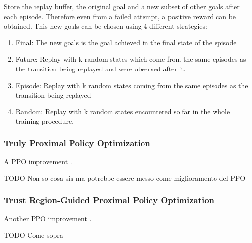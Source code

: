 \documentclass[12pt]{article}
\begin{document}
Store the replay buffer, the original goal and a new subset of other goals after each episode. Therefore even from a failed attempt, a positive reward can be obtained.
This new goals can be chosen using 4 different strategies:
\begin{enumerate}
    \item Final: The new goals is the goal achieved in the final state of the episode
    \item Future: Replay with k random states which come from the same episodes as the transition being replayed and were observed after it.
    \item Episode: Replay with k random states coming from the same episodes as the transition being replayed
    \item Random: Replay with k random states encountered so far in the whole training procedure.
\end{enumerate}

\subsubsection{Truly Proximal Policy Optimization}

A PPO improvement \cite{truly-ppo}.

TODO Non so cosa sia ma potrebbe essere messo come miglioramento del PPO

\subsubsection{Trust Region-Guided Proximal Policy Optimization}

Another PPO improvement \cite{trgppo}.

TODO Come sopra

\newpage

\printbibliography
\end{document}
